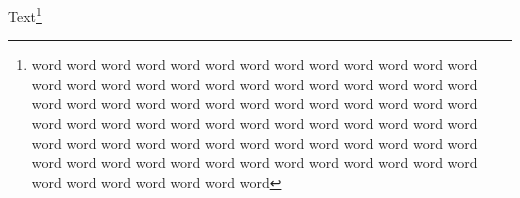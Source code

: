 Text\footnote{word word word word word word word word word word word word word word word word word word word word word word word word word word word word word word word word word word word word word word word word word word word word word word word word word word word word word word word word word word word word word word word word word word word word word word word word word word word word word word word word word word word word word}
